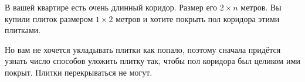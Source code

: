 В вашей квартире есть очень длинный коридор. Размер его $2\times n$ метров. Вы купили плиток размером $1\times 2$ метров и хотите покрыть пол коридора этими плитками.

Но вам не хочется укладывать плитки как попало, поэтому сначала придётся узнать число способов уложить плитку так, чтобы пол коридора был целиком ими покрыт. Плитки перекрываться не могут.
